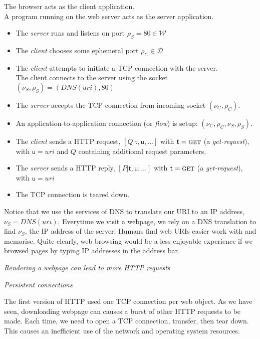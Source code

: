 The browser acts as the client application. \\
A program running on the web server acts as the server application. 
\begin{itemize}[nosep]
\renewcommand{\labelitemi}{$\Box$}
\item The \textit{server} runs and listens on port $\rho_S = 80 \in \mathcal{W}$
\item The \textit{client} chooses some ephemeral port $\rho_C \in \mathcal{D}$
\item The \textit{client} attempts to initiate a TCP connection with the server. \\
The client connects to the server using the socket $(\nu_S,\rho_S) = (DNS(uri),80)$ 
\item The \textit{server} accepts the TCP connection from incoming socket $(\nu_C,\rho_C)$. 
\item An application-to-application connection (or \textit{flow}) is setup: $(\nu_C, \rho_C, \nu_S, \rho_S)$.
\item The \textit{client} sends a HTTP request, $[Q | \mathsf{t},\mathsf{u}, ...]$
with $\mathsf{t} = \textsc{get}$ (a \textit{get-request}), 
with $\mathsf{u} = uri$ and $Q$ containing additional request parameters. 
\item The \textit{server} sends a HTTP reply, $[P | \mathsf{t},\mathsf{u}, ...]$
with $\mathsf{t} = \textsc{get}$ (a \textit{get-request}), 
with $\mathsf{u} = uri$
\item The TCP connection is teared down.
\end{itemize}

Notice that we use the services of DNS to translate our URI to an IP address, 
$\nu_S = DNS(uri)$. Everytime we visit a webpage, we rely on a DNS translation 
to find $\nu_S$, the IP address of the server. Humans find web URIs easier 
work with and memorise. Quite clearly, web browsing 
would be a less enjoyable experience if we browsed pages by typing IP addresses 
in the address bar.


\frmrule 

\textit{Rendering a webpage can lead to more HTTP requests}

\frmrule 


\textit{Persistent connections}

The first version of HTTP used one TCP connection per web object. 
As we have seen, downloading webpage can causes a burst 
of other HTTP requests to be made. Each time, we need 
to open a TCP connection, transfer, then tear down. 
This causes an inefficient use of the network and operating system resources. 


